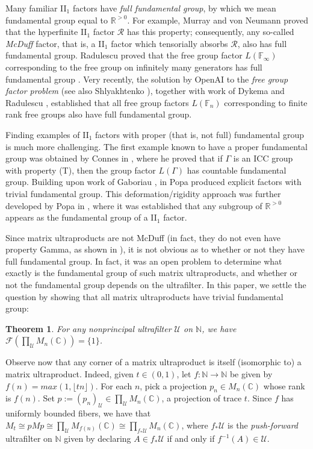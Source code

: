 \documentclass[12pt]{amsart}
\numberwithin{equation}{section}
\newtheorem*{thm*}{Theorem}
\theoremstyle{definition}
\newcommand{\C}{\mathbb{C}}
\newcommand{\N}{\mathbb{N}}
\def\bb{\mathbb}
\def\cal{\mathcal}
\newcommand\cU{{\cal U}}
\def \u{\mathcal U}
\begin{document}
Many familiar II$_1$ factors have \emph{full fundamental group}, by which we mean fundamental group equal to $\mathbb{R}^{>0}$.  For example, Murray and von Neumann proved that the hyperfinite II$_1$ factor $\mathcal{R}$ has this property; consequently, any so-called \emph{McDuff} factor, that is, a II$_1$ factor which tensorially absorbs $\mathcal{R}$, also has full fundamental group.  Radulescu proved that
the free group factor $L(\mathbb F_\infty)$ corresponding to the free group on infinitely many generators has full fundamental group
\cite{ruadulescu1992fundamental}. Very recently, the solution by OpenAI \cite{openAI2026} to the \emph{free group factor problem} (see also Shlyakhtenko \cite{shlyakhtenko2026isomorphism}), together with work of Dykema \cite{dykema1994interpolated} and Radulescu \cite{Radulescu94}, established that all free group factors $L(\bb F_n)$ corresponding to finite rank free groups also have full fundamental group.

Finding examples of II$_1$ factors with proper (that is, not full) fundamental group is much more challenging.  The first example known to have a proper fundamental group was obtained by Connes in \cite{connes1980factor}, where he proved that if $\Gamma$ is an ICC group with property (T), then the group factor $L(\Gamma)$ has countable fundamental group.  Building upon work of Gaboriau \cite{gaboriau2002invariants}, in \cite{popa2006class} Popa produced explicit factors with trivial fundamental group. This  deformation/rigidity approach was further developed by Popa in \cite{popa2006strong,popa2006strong2}, where it was established that any subgroup of $\mathbb{R}^{>0}$ appears as the fundamental group of a II$_1$ factor. 

Since matrix ultraproducts are not McDuff (in fact, they do not even have property Gamma, as shown in \cite[Theorem 5.1]{farah2014model}), it is not obvious as to whether or not they have full fundamental group.  In fact, it was an open problem to determine what exactly is the fundamental group of such  matrix ultraproducts, and whether or not the fundamental group depends on the ultrafilter.  In this paper, we settle the question by showing that all matrix ultraproducts have trivial fundamental group:

\begin{thm*}
For any nonprincipal ultrafilter $\cU$ on $\N$, we have $\mathcal{F}(\prod_\cU M_n(\bb C))=\{1\}$.
\end{thm*}

Observe now that any corner of a matrix ultraproduct is itself (isomorphic to) a matrix ultraproduct.  Indeed, given $t\in (0,1)$, let $f:\N\to \N$ be given by $f(n)=max(1,\lfloor tn\rfloor)$.  For each $n$, pick a projection $p_n\in M_n(\bb C)$ whose rank is $f(n)$.  Set $p:=(p_n)_\u\in \prod_\u M_n(\C)$, a projection of trace $t$.    Since $f$ has uniformly bounded fibers, we have that $M_t\cong pMp\cong \prod_\u M_{f(n)}(\bb C)\cong \prod_{f_*\u}M_n(\bb C)$, where $f_*\cU$ is the \emph{push-forward} ultrafilter on $\N$ given by declaring $A\in f_*\cU$ if and only if $f^{-1}(A)\in \cU$.   
\end{document}
